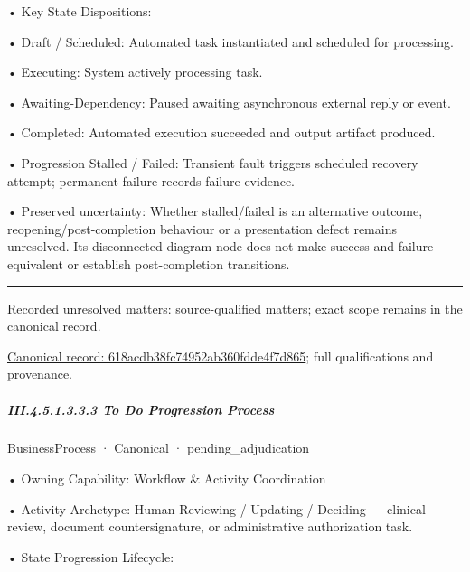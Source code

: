 •
Key State Dispositions:



•
Draft / Scheduled: Automated task instantiated and scheduled for processing.



•
Executing: System actively processing task.



•
Awaiting-Dependency: Paused awaiting asynchronous external reply or event.



•
Completed: Automated execution succeeded and output artifact produced.



•
Progression Stalled / Failed: Transient fault triggers scheduled recovery attempt; permanent failure records failure evidence.



•
Preserved uncertainty: Whether stalled/failed is an alternative outcome, reopening/post-completion behaviour or a presentation defect remains unresolved. Its disconnected diagram node does not make success and failure equivalent or establish post-completion transitions.



\medskip\hrule\medskip

{\small Recorded unresolved matters: source-qualified matters; exact scope remains in the canonical record.}\par
{\footnotesize \href{../../../../continuum/business/business-process/618acdb38fc74952ab360fdde4f7d865.md}{Canonical record: 618acdb38fc74952ab360fdde4f7d865}; full qualifications and provenance.}\par
\subparagraph*{III.4.5.1.3.3.3 To Do Progression Process}
\label{navigation:III.4.5.1.3.3.3}

\label{element:c5e4c3076b094c98a628179b91ae03d0}
{\small BusinessProcess · Canonical · pending\_adjudication}\par

•
Owning Capability: Workflow \& Activity Coordination



•
Activity Archetype: Human Reviewing / Updating / Deciding — clinical review, document countersignature, or administrative authorization task.



•
State Progression Lifecycle:



